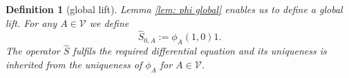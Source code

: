 \documentclass[b5paper,draft,openbib,12pt]{memoir}
\newtheorem{Def}{Definition}
\begin{document}
\begin{Def}[global lift]\label{de: s hat}
Lemma \ref{lem: phi global} enables us to define a global lift.
For any \(A\in\mathcal{V}\) we define 
\begin{equation}
\hat{S}_{0,A}:=\phi_A(1,0) 1.
\end{equation}
The operator \(\hat{S}\) fulfils the required differential equation and its uniqueness is inherited from the 
uniqueness of \(\phi_A\) for \(A\in\mathcal{V}\).
\end{Def}


\end{document}
